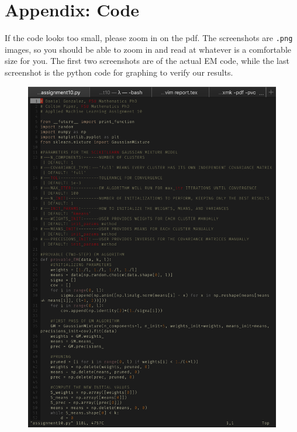 \documentclass[UTF8]{article}
\begin{document}
\section{Appendix: Code}
If the code looks too small, please zoom in on the pdf.
The screenshots are \texttt{.png} images, so you should be able to zoom in and read at whatever is a comfortable size for you.
The first two screenshots are of the actual EM code, while the last screenshot is the python code for graphing to verify our results.
\begin{figure}[H]
    \centering
    \includegraphics[scale=0.85]{./figures/narrowcode1.png}
\end{figure}
\end{document}
